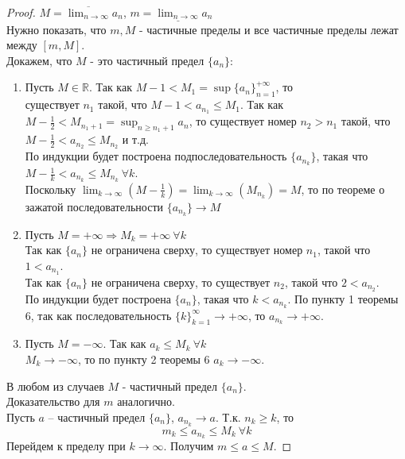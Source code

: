     \begin{proof}
        $M = \overline{\lim_{n \to \infty}} a_{n}$, $m = \underline{\lim_{n \to \infty}} a_{n}$\\
        Нужно показать, что $m, M$ - частичные пределы и все частичные пределы лежат между $[m, M]$.\\
        Докажем, что $M$ - это частичный предел $\{a_{n}\}$:
        \begin{enumerate}
            \item 
            Пусть $M \in \mathds{R}$. Так как $M-1 < M_1 = \sup\{a_{n}\}_{n = 1}^{+\infty}$, то \\
            существует $n_1$ такой, что $M-1 < a_{n_1} \leq M_1$. Так как $M - \frac{1}{2} < M_{n_1 + 1} = \sup_{n \geq n_1+1}{a_{n}}$, то существует номер $n_2 > n_1$ такой, что $M - \frac{1}{2} < a_{n_2} \leq M_{n_2}$ и т.д.\\
            По индукции будет построена подпоследовательность $\{a_{n_{k}}\}$, такая что\\
            $M-\frac{1}{k} < a_{n_{k}} \leq M_{n_{k}} \ \forall k$.\\
            Поскольку $\lim_{k \to \infty} (M - \frac{1}{k}) = \lim_{k \to \infty} (M_{n_{k}}) = M$, то по теореме о зажатой последовательности $\{a_{n_{k}}\} \to M$
            \item 
            Пусть $M = +\infty \Rightarrow M_{k} = +\infty \ \forall k$\\
            Так как $\{a_{n}\}$ не ограничена сверху, то существует номер $n_1$, такой что $1 < a_{n_1}$.\\
            Так как $\{a_{n}\}$ не ограничена сверху, то существует $n_2$, такой что $2 < a_{n_2}$.\\
            По индукции будет построена $\{a_{n}\}$, такая что $k < a_{n_{k}}$. По пункту 1 теоремы 6, так как последовательность $\{k\}_{k = 1}^{\infty} \to +\infty$, то $a_{n_{k}} \to +\infty$.
            \item 
            Пусть $M = -\infty$. Так как $a_{k} \leq M_{k} \ \forall k$\\
            $M_{k} \to -\infty$, то по пункту 2 теоремы 6 $a_{k} \to -\infty$.
        \end{enumerate}
        В любом из случаев $M$ - частичный предел $\{a_{n}\}$.\\
        Доказательство для $m$ аналогично.\\
        Пусть $a$ -- частичный предел $\{a_{n}\}$, $a_{n_{k}} \rightarrow a$. Т.к. $n_{k} \geq k$, то 
            \[m_{k} \leq a_{n_{k}} \leq M_{k} \  \forall k\]
            Перейдем к пределу при $k \rightarrow \infty$. Получим $m \leq a \leq M$.
    \end{proof}
    